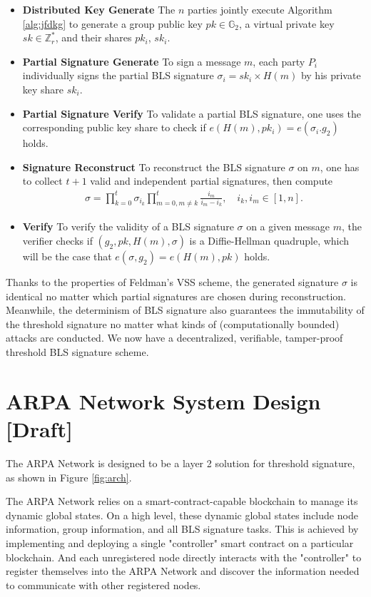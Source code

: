 \documentclass[11pt]{article}
\begin{document}
\begin{itemize}
    \item[] \textbf{Distributed Key Generate} The $n$ parties jointly execute Algorithm \ref{alg:jfdkg} to generate a group public key $pk \in \mathbb{G}_2$, a virtual private key $sk \in \mathbb{Z}_r^*$, and their shares $pk_i$, $sk_i$.
    \item[] \textbf{Partial Signature Generate} To sign a message $m$, each party $P_i$ individually signs the partial BLS signature $\sigma_i=sk_i \times H(m)$ by his private key share $sk_i$.
    \item[] \textbf{Partial Signature Verify} To validate a partial BLS signature, one uses the corresponding public key share to check if $e(H(m),pk_i)=e(\sigma_i.g_2)$ holds.
    \item[] \textbf{Signature Reconstruct} To reconstruct the BLS signature $\sigma$ on $m$, one has to collect $t+1$ valid and independent partial signatures, then compute
    \begin{align*}
        \sigma = \prod_{k=0}^t \sigma_{i_k} \prod_{m=0, m\neq k}^t \frac{i_m}{i_m-i_k},\quad i_k, i_m \in [1,n].
    \end{align*}
    \item[] \textbf{Verify} To verify the validity of a BLS signature $\sigma$ on a given message $m$, the verifier checks if $(g_2,pk,H(m),\sigma)$ is a Diffie-Hellman quadruple, which will be the case that $e(\sigma,g_2)=e(H(m),pk)$ holds.
\end{itemize}

Thanks to the properties of Feldman's VSS scheme, the generated signature $\sigma$ is identical no matter which partial signatures are chosen during reconstruction. Meanwhile, the determinism of BLS signature also guarantees the immutability of the threshold signature no matter what kinds of (computationally bounded) attacks are conducted. We now have a decentralized, verifiable, tamper-proof threshold BLS signature scheme.

\section{ARPA Network System Design [Draft]}

The ARPA Network is designed to be a layer 2 solution for threshold signature, as shown in Figure \ref{fig:arch}. 

The ARPA Network relies on a smart-contract-capable blockchain to manage its dynamic global states. On a high level, these dynamic global states include node information, group information, and all BLS signature tasks. This is achieved by implementing and deploying a single "controller" smart contract on a particular blockchain. And each unregistered node directly interacts with the "controller" to register themselves into the ARPA Network and discover the information needed to communicate with other registered nodes.
\end{document}
